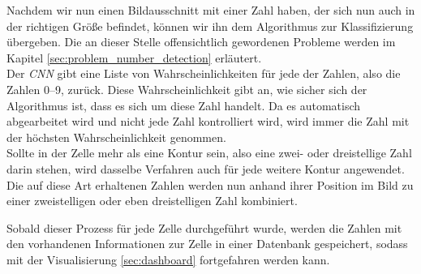 Nachdem wir nun einen Bildausschnitt mit einer Zahl haben, der sich nun auch in der richtigen Größe befindet, können wir ihn dem Algorithmus zur Klassifizierung übergeben. Die an dieser Stelle offensichtlich gewordenen Probleme werden im Kapitel \ref{sec:problem_number_detection} erläutert.\\\hfill
Der \textit{CNN} gibt eine Liste von Wahrscheinlichkeiten für jede der Zahlen, also die Zahlen 0–9, zurück. Diese Wahrscheinlichkeit gibt an, wie sicher sich der Algorithmus ist, dass es sich um diese Zahl handelt. Da es automatisch abgearbeitet wird und nicht jede Zahl kontrolliert wird, wird immer die Zahl mit der höchsten Wahrscheinlichkeit genommen.\\\hfill
Sollte in der Zelle mehr als eine Kontur sein, also eine zwei- oder dreistellige Zahl darin stehen, wird dasselbe Verfahren auch für jede weitere Kontur angewendet. Die auf diese Art erhaltenen Zahlen werden nun anhand ihrer Position im Bild zu einer zweistelligen oder eben dreistelligen Zahl kombiniert.\par
Sobald dieser Prozess für jede Zelle durchgeführt wurde, werden die Zahlen mit den vorhandenen Informationen zur Zelle in einer Datenbank gespeichert, sodass mit der Visualisierung \ref{sec:dashboard} fortgefahren werden kann.
